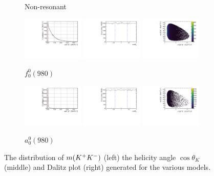 \begin{figure}[!h]
\begin{subfigure}[t]{1.0\textwidth}
        \caption{Non-resonant} 
       \label{fig:B2DsKK_model_NR}
    \end{subfigure}
    \begin{subfigure}[t]{1.0\textwidth}
        \includegraphics[width=0.32\textwidth]{figs/B2DsPhi/f0_phi_mass.pdf}
        \includegraphics[width=0.32\textwidth]{figs/B2DsPhi/f0_Helicity.pdf}
        \includegraphics[width=0.32\textwidth]{figs/B2DsPhi/f0_Dalitz_plot.pdf}
        \caption{$f_{0}^{0}(980)$} 
    \end{subfigure}
    \begin{subfigure}[t]{1.0\textwidth}
        \includegraphics[width=0.32\textwidth]{figs/B2DsPhi/a0_phi_mass.pdf}
        \includegraphics[width=0.32\textwidth]{figs/B2DsPhi/a0_Helicity.pdf}
        \includegraphics[width=0.32\textwidth]{figs/B2DsPhi/a0_Dalitz_plot.pdf}
        \caption{$a_{0}^{0}(980)$} 
    \end{subfigure}
    \caption{The distribution of $m({{K}^+}{{K}^-})$ (left) the helicity angle $\cos\theta_{K}$ (middle) and Dalitz plot (right) generated for the various models.}
    \label{fig:B2DsKK_models_1}
\end{figure}
